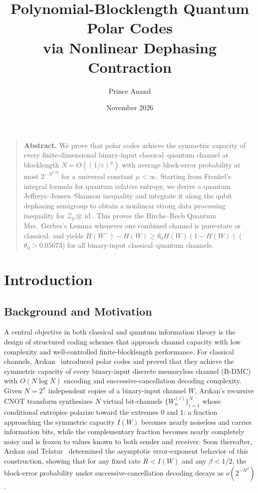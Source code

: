 \documentclass[10pt,a4paper]{article}
\title{Polynomial-Blocklength Quantum Polar Codes\\ via Nonlinear Dephasing Contraction}
\author{Prince Anand}
\date{November 2026}
\numberwithin{equation}{section}
\theoremstyle{plain}
\theoremstyle{definition}
\theoremstyle{remark}
\DeclareMathOperator{\id}{id}
\newcommand{\cZ}{\mathcal{Z}}
\begin{document}
\maketitle

\begin{quote}\small
\noindent\textbf{Abstract.} We prove that polar codes achieve the symmetric capacity of every finite-dimensional binary-input classical--quantum channel at blocklength $N = O((1/\varepsilon)^{\mu})$ with average block-error probability at most $2^{-N^{0.49}}$ for a universal constant $\mu < \infty$. Starting from Frenkel's integral formula for quantum relative entropy, we derive a quantum Jeffreys--Jensen--Shannon inequality and integrate it along the qubit dephasing semigroup to obtain a nonlinear strong data processing inequality for $\cZ_p \otimes \id$. This proves the Hirche--Reeb Quantum Mrs.\ Gerber's Lemma whenever one combined channel is pure-state or classical, and yields $H(W^-) - H(W) \ge \theta_0 H(W)(1 - H(W))$ ($\theta_0 > 0.05673$) for all binary-input classical--quantum channels.
\end{quote}

\section{Introduction}

\subsection{Background and Motivation}

A central objective in both classical and quantum information theory is the design of structured coding schemes that approach channel capacity with low complexity and well-controlled finite-blocklength performance. For classical channels, Ar{\i}kan~\cite{Arikan2009} introduced polar codes and proved that they achieve the symmetric capacity of every binary-input discrete memoryless channel (B-DMC) with $O(N \log N)$ encoding and successive-cancellation decoding complexity. Given $N = 2^n$ independent copies of a binary-input channel $W$, Ar{\i}kan's recursive CNOT transform synthesizes $N$ virtual bit-channels $\{W_n^{(i)}\}_{i=1}^{N}$ whose conditional entropies polarize toward the extremes $0$ and $1$: a fraction approaching the symmetric capacity $I(W)$ becomes nearly noiseless and carries information bits, while the complementary fraction becomes nearly completely noisy and is frozen to values known to both sender and receiver. Soon thereafter, Ar{\i}kan and Telatar~\cite{ArikanTelatar2009} determined the asymptotic error-exponent behavior of this construction, showing that for any fixed rate $R < I(W)$ and any $\beta < 1/2$, the block-error probability under successive-cancellation decoding decays as $o(2^{-N^{\beta}})$.
\end{document}
